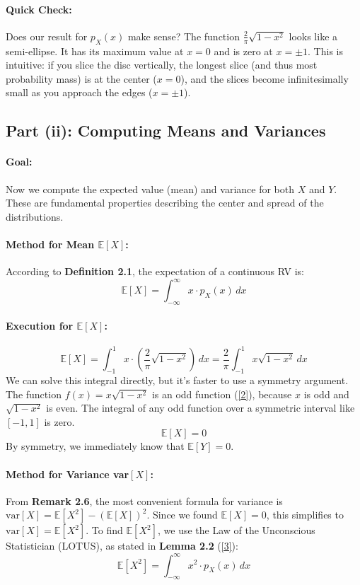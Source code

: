 \documentclass[11pt,a4paper]{article}
\theoremstyle{mystyle}
\begin{document}
\paragraph{Quick Check:} Does our result for $p_X(x)$ make sense? The function $\frac{2}{\pi}\sqrt{1-x^2}$ looks like a semi-ellipse. It has its maximum value at $x=0$ and is zero at $x=\pm 1$. This is intuitive: if you slice the disc vertically, the longest slice (and thus most probability mass) is at the center ($x=0$), and the slices become infinitesimally small as you approach the edges ($x=\pm 1$).

\subsection{Part (ii): Computing Means and Variances}

\paragraph{Goal:} Now we compute the expected value (mean) and variance for both $X$ and $Y$. These are fundamental properties describing the center and spread of the distributions.

\paragraph{Method for Mean $\mathbb{E}[X]$:}
According to \textbf{Definition 2.1}, the expectation of a continuous RV is:
\[
\mathbb{E}[X] = \int_{-\infty}^{\infty} x \cdot p_X(x) \, dx
\]

\paragraph{Execution for $\mathbb{E}[X]$:}
\[
\mathbb{E}[X] = \int_{-1}^{1} x \cdot \left( \frac{2}{\pi} \sqrt{1-x^2} \right) \, dx = \frac{2}{\pi} \int_{-1}^{1} x \sqrt{1-x^2} \, dx
\]
We can solve this integral directly, but it's faster to use a symmetry argument. The function $f(x) = x\sqrt{1-x^2}$ is an odd function (\hyperlink{note2}{[2]}), because $x$ is odd and $\sqrt{1-x^2}$ is even. The integral of any odd function over a symmetric interval like $[-1, 1]$ is zero.
\[
\mathbb{E}[X] = 0
\]
By symmetry, we immediately know that $\mathbb{E}[Y] = 0$.

\paragraph{Method for Variance var$[X]$:}
From \textbf{Remark 2.6}, the most convenient formula for variance is $\text{var}[X] = \mathbb{E}[X^2] - (\mathbb{E}[X])^2$. Since we found $\mathbb{E}[X]=0$, this simplifies to $\text{var}[X] = \mathbb{E}[X^2]$.
To find $\mathbb{E}[X^2]$, we use the Law of the Unconscious Statistician (LOTUS), as stated in \textbf{Lemma 2.2} (\hyperlink{note3}{[3]}):
\[
\mathbb{E}[X^2] = \int_{-\infty}^{\infty} x^2 \cdot p_X(x) \, dx
\]
\end{document}
